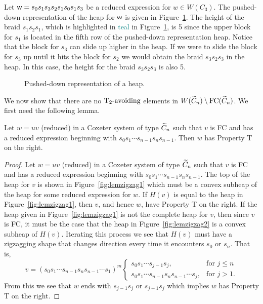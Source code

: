 \begin{example}
Let $\mathsf{w}=s_0s_1s_3s_2s_1s_0s_1s_3$ be a reduced expression for $w \in W(C_3)$. The pushed-down representation of the heap for $\mathsf{w}$ is given in Figure~\ref{fig:pusheddownheap}. The height of the braid $s_1s_2s_1$, which is highlighted in \textcolor{teal}{teal} in Figure~\ref{fig:pusheddownheap}, is 5 since the upper block for $s_1$ is located in the fifth row of the pushed-down representation heap. Notice that the block for $s_3$ can slide up higher in the heap. If we were to slide the block for $s_3$ up until it hits the block for $s_2$ we would obtain the braid $s_3s_2s_3$ in the heap. In this case, the height for the braid $s_3s_2s_3$ is also 5.   

\begin{figure}[h!] \centering
{}	
\caption{Pushed-down representation of a heap.}\label{fig:pusheddownheap}
\end{figure}
\end{example}

We now show that there are no $\operatorname{T_2-\mathrm{avoiding}}$ elements in $W(\widetilde{C}_n) \setminus \mathrm{FC}(\widetilde{C}_n)$. We first need the following lemma.

\begin{lemma}\label{lem:zigzag}
Let $w=uv$ (reduced) in a Coxeter system of type $\widetilde{C}_n$ such that $v$ is FC and has a reduced expression beginning with $s_0s_1\cdots s_{n-1}s_ns_{n-1}$. Then $w$ has Property T on the right.
\begin{proof}
	Let $w=uv$ (reduced) in a Coxeter system of type $\widetilde{C}_n$ such that $v$ is FC and has a reduced expression beginning with $s_0s_1 \cdots s_{n-1}s_ns_{n-1}$. The top of the heap for $v$ is shown in Figure~\ref{fig:lemzigzag1} which must be a convex subheap of the heap for some reduced expression for $w$. If $H(v)$ is equal to the heap in Figure~\ref{fig:lemzigzag1}, then $v$, and hence $w$, have Property T on the right. If the heap given in Figure~\ref{fig:lemzigzag1} is not the complete heap for $v$, then since $v$ is FC, it must be the case that the heap in Figure~\ref{fig:lemzigzag2} is a convex subheap of $H(v)$. Iterating this process we see that $H(v)$ must have a zigzagging shape that changes direction every time it encounters $s_0$ or $s_n$. That is, 
	\[
		v=(s_0s_1 \cdots s_{n-1}s_ns_{n-1} \cdots s_1)^m 
		\begin{cases}
 			s_0s_1 \cdots s_{j-1}s_j, & \text{for } j \leq n\\
 			s_0s_1 \cdots s_{n-1}s_ns_{n-1} \cdots s_j, & \text{for } j> 1.
		\end{cases}
	\]  
	From this we see that $w$ ends with $s_{j-1}s_j$ or $s_{j+1}s_j$ which implies $w$ has Property T on the right.
\end{proof}
\end{lemma}

